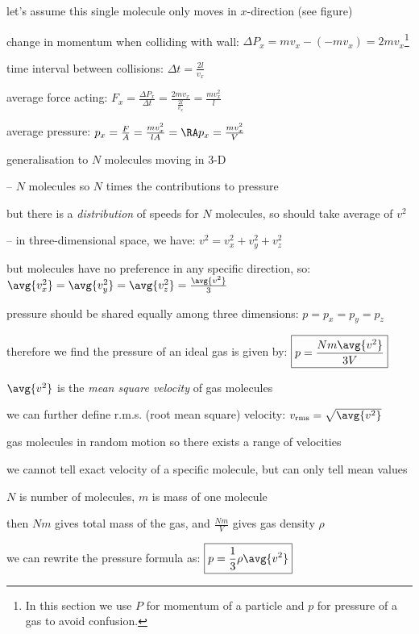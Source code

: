 let's assume this single molecule only moves in $x$-direction (see figure)

change in momentum when colliding with wall: $\Delta P_x = mv_x - (-mv_x) = 2mv_x$\footnote{In this section we use $P$ for momentum of a particle and $p$ for pressure of a gas to avoid confusion.}

time interval between collisions: $\Delta t=\frac{2l}{v_x}$

average force acting: $F_x=\frac{\Delta P_x}{\Delta t} = \frac{2mv_x}{\tfrac{2l}{v_x}} = \frac{mv_x^2}{l}$

average pressure: $p_x=\frac{F}{A} = \frac{mv_x^2}{lA} = \RA p_x = \frac{mv_x^2}{V}$

generalisation to $N$ molecules moving in 3-D

\begin{compactitem}
	\item[--] $N$ molecules so $N$ times the contributions to pressure
	
	but there is a \emph{distribution} of speeds for $N$ molecules, so should take average of $v^2$
	
	\item[--] in three-dimensional space, we have: $v^2=v_x^2 + v_y^2 + v_z^2$
	
	but molecules have no preference in any specific direction, so: $\avg{v_x^2} = \avg{v_y^2} = \avg{v_z^2} = \frac{\avg{v^2}}{3}$
	
	pressure should be shared equally among three dimensions: $p=p_x=p_y=p_z$
		
\end{compactitem}


therefore we find the pressure of an ideal gas is given by: $\boxed{p = \frac{Nm\avg{v^2}}{3V}}$

\cmt $\avg{v^2}$ is the \emph{mean square velocity} of gas molecules

we can further define r.m.s. (root mean square) velocity: $v_\text{rms} = \sqrt{\avg{v^2}}$ 

gas molecules in random motion so there exists a range of velocities

we cannot tell exact velocity of a specific molecule, but can only tell mean values

\cmt $N$ is number of molecules, $m$ is mass of one molecule

then $Nm$ gives total mass of the gas, and $\frac{Nm}{V}$ gives gas density $\rho$

we can rewrite the pressure formula as: $\boxed{p=\frac{1}{3}\rho \avg{v^2}}$ 

